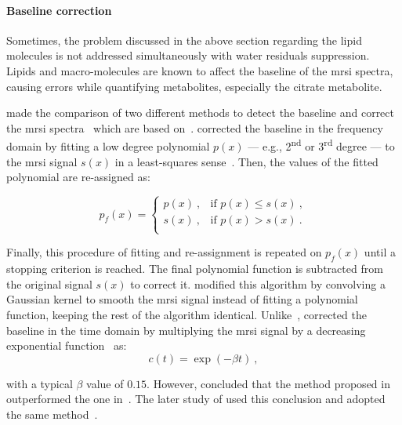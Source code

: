 \paragraph{Baseline correction} Sometimes, the problem discussed in the above section regarding the lipid molecules is not addressed simultaneously with water residuals suppression.
Lipids and macro-molecules are known to affect the baseline of the \ac{mrsi} spectra, causing errors while quantifying metabolites, especially the citrate metabolite.

\citeauthor{Parfait2012} made the comparison of two different methods to detect the baseline and correct the \ac{mrsi} spectra~\cite{Parfait2012} which are based on~\cite{Lieber2003,Devos2004}.
\citeauthor{Lieber2003} corrected the baseline in the frequency domain by fitting a low degree polynomial $p(x)$ --- e.g., 2\textsuperscript{nd} or 3\textsuperscript{rd} degree --- to the \ac{mrsi} signal $s(x)$ in a least-squares sense~\cite{Lieber2003}.
Then, the values of the fitted polynomial are re-assigned as:

\begin{equation}
	p_f(x) = 
	\begin{cases}
		p(x) \ , & \text{if $p(x) \leq s(x)$} \ , \\
		s(x) \ , & \text{if $p(x) > s(x)$} \ . \\
	\end{cases}
	\label{eq:lieber}
\end{equation}

Finally, this procedure of fitting and re-assignment is repeated on $p_f(x)$ until a stopping criterion is reached.
The final polynomial function is subtracted from the original signal $s(x)$ to correct it.
\citeauthor{Parfait2012} modified this algorithm by convolving a Gaussian kernel to smooth the \ac{mrsi} signal instead of fitting a polynomial function, keeping the rest of the algorithm identical. 
Unlike~\citeauthor{Lieber2003}, \citeauthor{Devos2004} corrected the baseline in the time domain by multiplying the \ac{mrsi} signal by a decreasing exponential function~\cite{Devos2004} as:
\begin{equation}
	c(t) = \exp (- \beta t) \ ,
	\label{eq:devos}
\end{equation}

\noindent with a typical $\beta$ value of $0.15$.
However, \citeauthor{Parfait2012} concluded that the method proposed in~\cite{Lieber2003} outperformed the one in~\cite{Devos2004}.
The later study of \citeauthor{trigui2017automatic} used this conclusion and adopted the same method~\cite{trigui2016classification,trigui2017automatic}.

